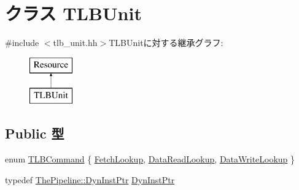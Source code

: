 \hypertarget{classTLBUnit}{
\section{クラス TLBUnit}
\label{classTLBUnit}
}


{\ttfamily \#include $<$tlb\_\-unit.hh$>$}TLBUnitに対する継承グラフ:\begin{figure}[H]
\begin{center}
\leavevmode
\includegraphics[height=2cm]{classTLBUnit}
\end{center}
\end{figure}
\subsection*{Public 型}
\begin{DoxyCompactItemize}
\item 
enum \hyperlink{classTLBUnit_a84156c3c25e02b62e71c79cb2bb242b6}{TLBCommand} \{ \hyperlink{classTLBUnit_a84156c3c25e02b62e71c79cb2bb242b6aee3054bfa4409a05b1621d500d4048a7}{FetchLookup}, 
\hyperlink{classTLBUnit_a84156c3c25e02b62e71c79cb2bb242b6a0818430be26628918457330f03d5d0d4}{DataReadLookup}, 
\hyperlink{classTLBUnit_a84156c3c25e02b62e71c79cb2bb242b6aaa5cca038c0fd9c8e1a68b6227cf1919}{DataWriteLookup}
 \}
\item 
typedef \hyperlink{classRefCountingPtr}{ThePipeline::DynInstPtr} \hyperlink{classTLBUnit_af9d0c8a46736ba6aa2d8bb94da1a5e73}{DynInstPtr}
\end{DoxyCompactItemize}
